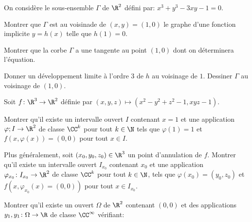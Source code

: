 \documentclass{report}
\begin{document}
\begin{exo}
    On considère le sous-ensemble \(\Gamma\) de \(\R^2\) défini par:
    \(x^3+y^3-3xy-1=0\).
    \begin{q}{1}
        Montrer que \(\Gamma\) est au voisinade de \((x,y)=(1,0)\) le graphe d'une
        fonction implicite \(y=h(x)\) telle que \(h(1)=0\).
    \end{q}
    \begin{q}{2}
        Montrer que la corbe \(\Gamma\) a une tangente au point \((1,0)\) dont on déterminera
        l'équation.
    \end{q}
    \begin{q}{3}
        Donner un développement limite à l'ordre \(3\) de \(h\) au voisinage de \(1\).
        Dessiner \(\Gamma\) au voisinage de \((1,0)\).
    \end{q}
\end{exo}

\begin{exo}
    Soit \(f\colon\R^3\to\R^2\) définie par \((x,y,z)\mapsto(x^2-y^2+z^2-1,xyz-1)\).
    \begin{q}{1}
        Montrer qu'il existe un intervalle ouvert \(I\) contenant \(x=1\) et une
        application \(\varphi;I\to\R^2\) de classe \(\CC^k\) pour tout \(k\in\N\) tels
        que \(\varphi(1)=1\) et \(f(x,\varphi(x))=(0,0)\) pour tout \(x\in I\).
    \end{q}
    \begin{q}{2}
        Plus généralement, soit \((x_0,y_0,z_0)\in\R^3\) un point d'annulation
        de \(f\). Montrer qu'il existe un intervalle ouvert \(I_{x_0}\) contenant \(x_0\)
        et une application \(\varphi_{x_0}\colon I_{x_0}\to\R^2\) de classe \(\CC^k\) pour
        tout \(k\in\N\), tels que \(\varphi(x_0)=(y_0,z_0)\) et \(f(x,\varphi_{x_0}(x)=(0,0))\)
        pour tout \(x\in I_{x_0}\).
    \end{q}
\end{exo}

\begin{exo}
    \begin{q}{1}
        Montrer qu'il existe un ouvert \(\Omega\) de \(\R^2\) contenant \((0,0)\) et
        des applications \(y_1,y_1\colon \Omega\to\R\) de classe \(\CC^\infty\) vérifiant:
    \end{q}
\end{exo}
\end{document}
